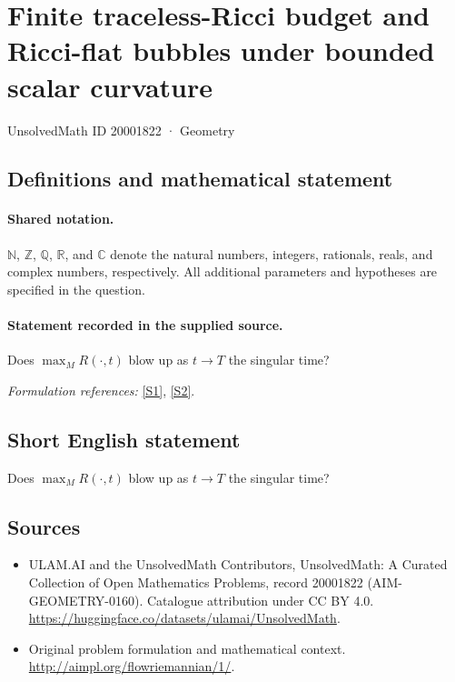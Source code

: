 \documentclass[11pt]{article}
\newcommand{\sref}[2]{\hyperlink{source:#1:#2}{[S#2]}}
\begin{document}
\setcounter{section}{20001821}
\section{Finite traceless-Ricci budget and Ricci-flat bubbles under bounded scalar curvature}\label{20001822}
{\small UnsolvedMath ID 20001822 · Geometry}
\subsection{Definitions and mathematical statement}

\paragraph{Shared notation.}$\mathbb N$, $\mathbb Z$, $\mathbb Q$, $\mathbb R$, and $\mathbb C$ denote the natural numbers, integers, rationals, reals, and complex numbers, respectively. All additional parameters and hypotheses are specified in the question.


\paragraph{Statement recorded in the supplied source.}
Does $\max_M R(\cdot,t)$ blow up as $t\to T$ the singular time?
\par\smallskip\textit{Formulation references:} \sref{20001822}{1}, \sref{20001822}{2}.
\subsection{Short English statement}
Does $\max_M R(\cdot,t)$ blow up as $t\to T$ the singular time?
\subsection{Sources}
\begin{itemize}
\item[\hypertarget{source:20001822:1}{S1}] ULAM.AI and the UnsolvedMath Contributors, UnsolvedMath: A Curated Collection of Open Mathematics Problems, record 20001822 (AIM-GEOMETRY-0160). Catalogue attribution under CC BY 4.0.
\url{https://huggingface.co/datasets/ulamai/UnsolvedMath}.
\item[\hypertarget{source:20001822:2}{S2}] Original problem formulation and mathematical context.
\url{http://aimpl.org/flowriemannian/1/}.
\end{itemize}
\label{end:20001822}
\end{document}
